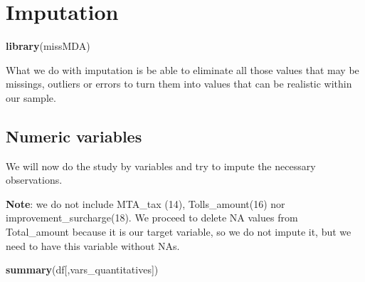 \documentclass[
  18pt,
  a4paper]{article}
\newenvironment{Shaded}{\begin{snugshade}}{\end{snugshade}}
\newcommand{\DecValTok}[1]{\textcolor[rgb]{0.00,0.00,0.81}{#1}}
\newcommand{\KeywordTok}[1]{\textcolor[rgb]{0.13,0.29,0.53}{\textbf{#1}}}
\newcommand{\NormalTok}[1]{#1}
\newcommand{\OperatorTok}[1]{\textcolor[rgb]{0.81,0.36,0.00}{\textbf{#1}}}
\newcommand{\StringTok}[1]{\textcolor[rgb]{0.31,0.60,0.02}{#1}}
\begin{document}
\hypertarget{imputation}{%
\section{Imputation}\label{imputation}}

\begin{Shaded}
\begin{Highlighting}[]
\KeywordTok{library}\NormalTok{(missMDA)}
\end{Highlighting}
\end{Shaded}

What we do with imputation is be able to eliminate all those values that
may be missings, outliers or errors to turn them into values that can be
realistic within our sample.

\hypertarget{numeric-variables}{%
\subsection{Numeric variables}\label{numeric-variables}}

We will now do the study by variables and try to impute the necessary
observations.

\textbf{Note}: we do not include MTA\_tax (14), Tolls\_amount(16) nor
improvement\_surcharge(18). We proceed to delete NA values from
Total\_amount because it is our target variable, so we do not impute it,
but we need to have this variable without NAs.

\begin{Shaded}
\end{Shaded}

\begin{Shaded}
\begin{Highlighting}[]
\KeywordTok{summary}\NormalTok{(df[,vars_quantitatives])}
\end{Highlighting}
\end{Shaded}
\end{document}
